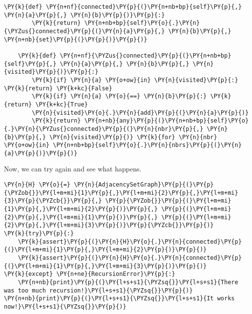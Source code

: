 \begin{Verbatim}[commandchars=\\\{\}]
    \PY{k}{def} \PY{n+nf}{connected}\PY{p}{(}\PY{n+nb+bp}{self}\PY{p}{,} \PY{n}{a}\PY{p}{,} \PY{n}{b}\PY{p}{)}\PY{p}{:}
        \PY{k}{return} \PY{n+nb+bp}{self}\PY{o}{.}\PY{n}{\PYZus{}connected}\PY{p}{(}\PY{n}{a}\PY{p}{,} \PY{n}{b}\PY{p}{,} \PY{n+nb}{set}\PY{p}{(}\PY{p}{)}\PY{p}{)}

    \PY{k}{def} \PY{n+nf}{\PYZus{}connected}\PY{p}{(}\PY{n+nb+bp}{self}\PY{p}{,} \PY{n}{a}\PY{p}{,} \PY{n}{b}\PY{p}{,} \PY{n}{visited}\PY{p}{)}\PY{p}{:}
        \PY{k}{if} \PY{n}{a} \PY{o+ow}{in} \PY{n}{visited}\PY{p}{:} \PY{k}{return} \PY{k+kc}{False}
        \PY{k}{if} \PY{n}{a} \PY{o}{==} \PY{n}{b}\PY{p}{:} \PY{k}{return} \PY{k+kc}{True}
        \PY{n}{visited}\PY{o}{.}\PY{n}{add}\PY{p}{(}\PY{n}{a}\PY{p}{)}
        \PY{k}{return} \PY{n+nb}{any}\PY{p}{(}\PY{n+nb+bp}{self}\PY{o}{.}\PY{n}{\PYZus{}connected}\PY{p}{(}\PY{n}{nbr}\PY{p}{,} \PY{n}{b}\PY{p}{,} \PY{n}{visited}\PY{p}{)} \PY{k}{for} \PY{n}{nbr} \PY{o+ow}{in} \PY{n+nb+bp}{self}\PY{o}{.}\PY{n}{nbrs}\PY{p}{(}\PY{n}{a}\PY{p}{)}\PY{p}{)}
\end{Verbatim}



Now, we can try again and see what happens.


\begin{Verbatim}[commandchars=\\\{\}]
\PY{n}{H} \PY{o}{=} \PY{n}{AdjacencySetGraph}\PY{p}{(}\PY{p}{\PYZob{}}\PY{l+m+mi}{1}\PY{p}{,}\PY{l+m+mi}{2}\PY{p}{,}\PY{l+m+mi}{3}\PY{p}{\PYZcb{}}\PY{p}{,} \PY{p}{\PYZob{}}\PY{p}{(}\PY{l+m+mi}{1}\PY{p}{,}\PY{l+m+mi}{2}\PY{p}{)}\PY{p}{,} \PY{p}{(}\PY{l+m+mi}{2}\PY{p}{,}\PY{l+m+mi}{1}\PY{p}{)}\PY{p}{,} \PY{p}{(}\PY{l+m+mi}{2}\PY{p}{,}\PY{l+m+mi}{3}\PY{p}{)}\PY{p}{\PYZcb{}}\PY{p}{)}
\PY{k}{try}\PY{p}{:}
    \PY{k}{assert}\PY{p}{(}\PY{n}{H}\PY{o}{.}\PY{n}{connected}\PY{p}{(}\PY{l+m+mi}{1}\PY{p}{,}\PY{l+m+mi}{2}\PY{p}{)}\PY{p}{)}
    \PY{k}{assert}\PY{p}{(}\PY{n}{H}\PY{o}{.}\PY{n}{connected}\PY{p}{(}\PY{l+m+mi}{1}\PY{p}{,}\PY{l+m+mi}{3}\PY{p}{)}\PY{p}{)}
\PY{k}{except} \PY{n+ne}{RecursionError}\PY{p}{:}
    \PY{n+nb}{print}\PY{p}{(}\PY{l+s+s1}{\PYZsq{}}\PY{l+s+s1}{There was too much recursion!}\PY{l+s+s1}{\PYZsq{}}\PY{p}{)}
\PY{n+nb}{print}\PY{p}{(}\PY{l+s+s1}{\PYZsq{}}\PY{l+s+s1}{It works now!}\PY{l+s+s1}{\PYZsq{}}\PY{p}{)}
\end{Verbatim}

\begin{Verbatim}

\end{Verbatim}


